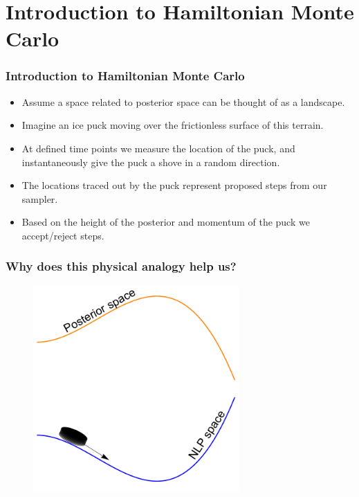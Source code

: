 \documentclass[handout]{beamer}
\begin{document}
\section{Introduction to Hamiltonian Monte Carlo}
\frame{\tableofcontents[currentsection]}

\begin{frame}
	\frametitle{Introduction to Hamiltonian Monte Carlo}
	\begin{itemize}
		\item<2-> Assume a space related to posterior space can be thought of as a landscape.
		\item<3-> Imagine an ice puck moving over the frictionless surface of this terrain.
		\item<4-> At defined time points we measure the location of the puck, and instantaneously give the puck a shove in a random direction.
		\item<5-> The locations traced out by the puck represent proposed steps from our sampler.
		\item<6-> Based on the height of the posterior and momentum of the puck we accept/reject steps.
	\end{itemize}
	
\end{frame}

\begin{frame}
	\frametitle{Why does this physical analogy help us?}
	
	\begin{figure}[ht]
		\centerline{\includegraphics[width=0.7\textwidth]{./Figures/lec5_icePuck.pdf}}
	\end{figure}
	
\end{frame}
\end{document}
